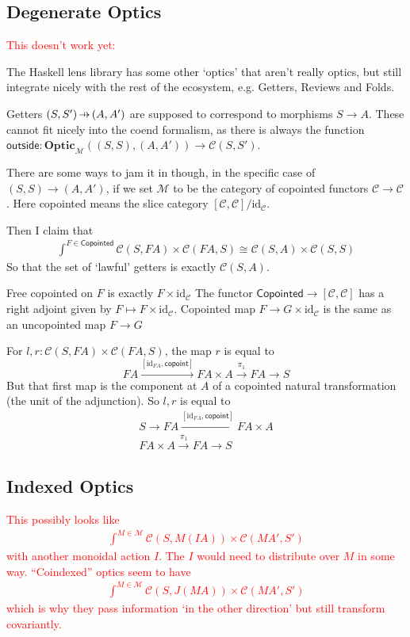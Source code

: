 \documentclass[11pt,a4paper]{article}
\theoremstyle{plain}
\theoremstyle{definition}
\newcommand{\C}{\mathscr{C}}
\newcommand{\M}{\mathscr{M}}
\newcommand{\Optic}{\mathbf{Optic}}
\newcommand{\id}{\mathrm{id}}
\newcommand{\outside}{\mathsf{outside}}
\newcommand{\hto}{\ensuremath{\,\mathaccent\shortmid\rightarrow\,}}
\newcommand{\todo}[1]{\textcolor{red}{\small #1}}
\begin{document}
\subsection{Degenerate Optics}
\todo{This doesn't work yet:}

The Haskell lens library has some other `optics' that aren't really optics, but still integrate nicely with the rest of the ecosystem, e.g. Getters, Reviews and Folds.

Getters $(S, S') \hto (A, A')$ are supposed to correspond to morphisms $S \to A$. These cannot fit nicely into the coend formalism, as there is always the function $\outside : \Optic_\M((S, S), (A, A')) \to \C(S, S')$.

There are some ways to jam it in though, in the specific case of $(S, S) \to (A, A')$, if we set $\M$ to be the category of copointed functors $\C \to \C$. Here copointed means the slice category $[\C, \C] / \id_\C$.

Then I claim that
\begin{align*}
  \int^{F \in \mathsf{Copointed}} \C(S, FA) \times \C(FA, S) \cong \C(S, A) \times \C(S, S)
\end{align*}
So that the set of `lawful' getters is exactly $\C(S, A)$.

Free copointed on $F$ is exactly $F \times \id_\C$
The functor $\mathsf{Copointed} \to [\C, \C]$ has a right adjoint given by $F \mapsto F \times \id_\C$. Copointed map $F \to G \times \id_\C$ is the same as an uncopointed map $F \to G$

For $l, r : \C(S, FA) \times \C(FA, S)$, the map $r$ is equal to
\[
  FA \xrightarrow{[\id_{FA}, \mathsf{copoint}]} FA \times A \xrightarrow{\pi_1} FA \to S
\]
But that first map is the component at $A$ of a copointed natural transformation (the unit of the adjunction). So $l, r$ is equal to
\begin{align*}
  S \to FA \xrightarrow{[\id_{FA}, \mathsf{copoint}]} FA \times A\\
  FA \times A \xrightarrow{\pi_1} FA \to S
\end{align*}


\subsection{Indexed Optics}
\todo{
  This possibly looks like
  \begin{align*}
    \int^{M \in \M} \C(S, M(IA)) \times \C(M A', S')
  \end{align*}
  with another monoidal action $I$. The $I$ would need to distribute over $M$ in some way. ``Coindexed'' optics seem to have
  \begin{align*}
    \int^{M \in \M} \C(S, J(MA)) \times \C(M A', S')
  \end{align*}
  which is why they pass information `in the other direction' but still transform covariantly.
}
\end{document}
